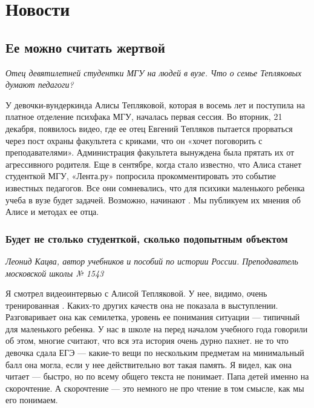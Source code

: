 
\chapter{Новости}

\section{Ее можно считать жертвой}
\textit{Отец девятилетней студентки МГУ  на людей в вузе. Что о семье Тепляковых думают педагоги?}

У девочки-вундеркинда Алисы Тепляковой, которая в восемь лет  и поступила на платное отделение психфака МГУ, началась первая сессия. Во вторник, 21 декабря, появилось видео, где ее отец Евгений Тепляков пытается прорваться через пост охраны факультета с криками, что он «хочет поговорить с преподавателями». Администрация факультета вынуждена была прятать их от агрессивного родителя. Еще в сентябре, когда стало известно, что Алиса станет студенткой МГУ, «Лента.ру» попросила прокомментировать это событие известных педагогов. Все они сомневались, что для психики маленького ребенка учеба в вузе будет  задачей. Возможно,  начинают . Мы публикуем их мнения об Алисе и методах ее отца.

\subsection{Будет не столько студенткой, сколько подопытным объектом}
\textit{Леонид Кацва, автор учебников и пособий по истории России. Преподаватель московской школы № 1543}

Я смотрел видеоинтервью с Алисой Тепляковой. У нее, видимо, очень тренированная . Каких-то других качеств она не показала в выступлении. Разговаривает она как семилетка, уровень ее понимания ситуации --- типичный для маленького ребенка. У нас в школе на  перед началом учебного года говорили об этом, многие считают, что вся эта история очень дурно пахнет.  не то что девочка сдала ЕГЭ ---  какие-то вещи по нескольким предметам на минимальный балл она могла, если у нее действительно вот такая память. Я видел, как она читает --- быстро, но  по всему общего  текста не понимает. Папа  детей именно на скорочтение. А скорочтение --- это немного не про чтение в том смысле, как мы его понимаем.

